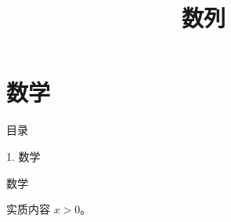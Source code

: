 \documentclass[aspectratio=169,10pt,fontset=fandol]{ctexbeamer}
\title{数列}
\begin{document}
\section{数学}
\begin{frame}[t,fragile]{目录}
\normalsize
{\color{blue}\normalsize 1. 数学\par}\vspace{0.22em}
\end{frame}
\begin{frame}[t,fragile]{数学}
\normalsize
{\normalsize
实质内容 $x>0$。


}
\end{frame}
\end{document}
